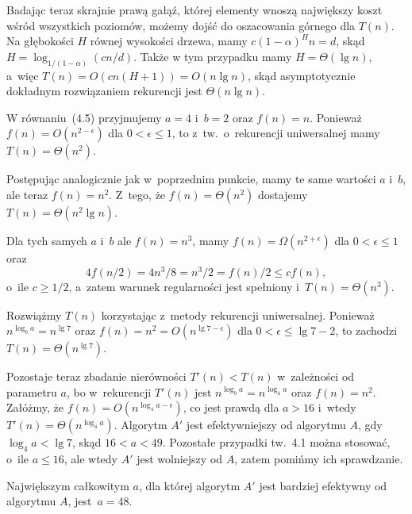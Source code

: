 Badając teraz skrajnie prawą gałąź, której elementy wnoszą największy koszt wśród wszystkich poziomów, możemy dojść do oszacowania górnego dla $T(n)$. Na głębokości $H$ równej wysokości drzewa, mamy $c(1-\alpha)^Hn=d$, skąd $H=\log_{1/(1-\alpha)}(cn/d)$. Także w tym przypadku mamy $H=\Theta(\lg n)$, a~więc $T(n)=O(cn(H+1))=O(n\lg n)$, skąd asymptotycznie dokładnym rozwiązaniem rekurencji jest $\Theta(n\lg n)$.



\exercise %

\subexercise
W równaniu~(4.5) przyjmujemy $a=4$ i~$b=2$ oraz $f(n)=n$. Ponieważ $f(n)=O(n^{2-\epsilon})$ dla $0<\epsilon\le1$, to z~tw.~o~rekurencji uniwersalnej mamy $T(n)=\Theta(n^2)$.

\subexercise
Postępując analogicznie jak w~poprzednim punkcie, mamy te same wartości $a$ i~$b$, ale teraz $f(n)=n^2$. Z~tego, że $f(n)=\Theta(n^2)$ dostajemy $T(n)=\Theta(n^2\lg n)$.

\subexercise
Dla tych samych $a$ i~$b$ ale $f(n)=n^3$, mamy $f(n)=\Omega(n^{2+\epsilon})$ dla $0<\epsilon\le1$ oraz
\[
	4f(n/2) = 4n^3\!/8 = n^3\!/2 = f(n)/2 \le cf(n),
\]
o~ile $c\ge1/2$, a~zatem warunek regularności jest spełniony i~$T(n)=\Theta(n^3)$.

\exercise %
Rozwiążmy $T(n)$ korzystając z~metody rekurencji uniwersalnej. Ponieważ $n^{\log_ba}=n^{\lg7}$ oraz $f(n)=n^2=O(n^{\lg7-\epsilon})$ dla $0<\epsilon\le\lg7-2$, to zachodzi $T(n)=\Theta(n^{\lg7})$.

Pozostaje teraz zbadanie nierówności $T'(n)<T(n)$ w~zależności od parametru $a$, bo w~rekurencji $T'(n)$ jest $n^{\log_ba}=n^{\log_4a}$ oraz $f(n)=n^2$. Załóżmy, że $f(n)=O(n^{\log_4a-\epsilon})$, co jest prawdą dla $a>16$ i~wtedy $T'(n)=\Theta(n^{\log_4a})$. Algorytm $A'$ jest efektywniejszy od algorytmu $A$, gdy $\log_4a<\lg7$, skąd $16<a<49$. Pozostałe przypadki tw.~4.1 można stosować, o~ile $a\le16$, ale wtedy $A'$ jest wolniejszy od $A$, zatem pomińmy ich sprawdzanie.

Największym całkowitym $a$, dla której algorytm $A'$ jest bardziej efektywny od algorytmu $A$, jest~$a=48$.

